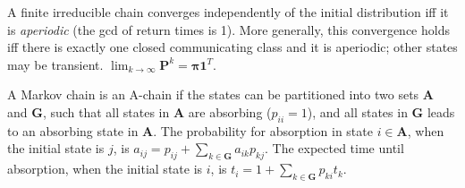 A finite irreducible chain converges independently of the initial distribution iff it is \emph{aperiodic} (the gcd of return times is 1).
More generally, this convergence holds iff there is exactly one closed communicating class and it is aperiodic; other states may be transient.
$\lim_{k\rightarrow\infty}\mathbf{P}^k = \mathbf{\pi}\mathbf{1}^{T}$.

A Markov chain is an A-chain if the states can be partitioned into two sets $\mathbf{A}$ and $\mathbf{G}$, such that all states in $\mathbf{A}$ are absorbing ($p_{ii}=1$), and all states in $\mathbf{G}$ leads to an absorbing state in $\mathbf{A}$.
The probability for absorption in state $i\in\mathbf{A}$, when the initial state is $j$, is $a_{ij} = p_{ij}+\sum_{k\in\mathbf{G}} a_{ik}p_{kj}$.
The expected time until absorption, when the initial state is $i$, is $t_i = 1+\sum_{k\in\mathbf{G}}p_{ki}t_k$.
